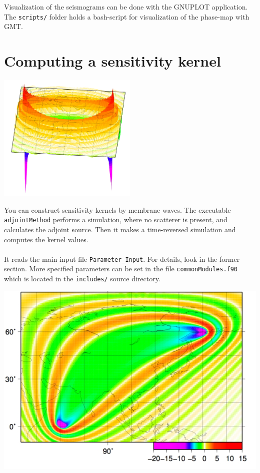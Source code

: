 \documentclass[a4paper,
                          headsepline,
                          listof=totoc,
                          toc=listof,
                          headings=small]{scrreprt} %
\begin{document}
Visualization of the seismograms can be done with the GNUPLOT application.
The \texttt{scripts/} folder holds a bash-script for visualization of the
phase-map with GMT.

\chapter{Computing a sensitivity kernel}
\begin{flushright}
\includegraphics[width=0.5\textwidth]{figures/adjointkernel-L150-3D.jpg}
\end{flushright}

You can construct sensitivity kernels by membrane waves.
The executable \texttt{adjointMethod} performs a simulation, where no scatterer is present,
and calculates the adjoint source.
Then it makes a time-reversed simulation and computes the kernel values.
\\
\\
It reads the main input file \texttt{Parameter\_Input}. For details, look in the former
section. More specified parameters can be set
in the file \texttt{commonModules.f90} which is located in the \texttt{includes/} source directory.

\vspace{2cm}
\begin{center}
\includegraphics[width=1.0\textwidth]{figures/tibet-adjointHet40.jpg}
\end{center}
\end{document}
